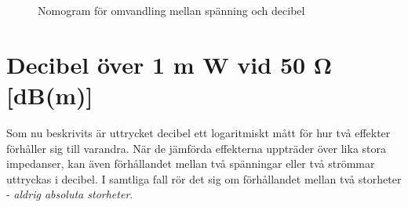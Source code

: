 \begin{rev-raderas}
\begin{figure}
  \caption{Nomogram för omvandling mellan spänning och decibel}
  \label{appendix-c-nomogram-db-spänning}
\end{figure}

\end{rev-raderas}

\section{Decibel över 1 m W vid 50 Ω [dB(m)]}

Som nu beskrivits är uttrycket decibel ett logaritmiskt mått för hur
två effekter förhåller sig till varandra. När de jämförda effekterna
uppträder över lika stora impedanser, kan även förhållandet mellan två
spänningar eller två strömmar uttryckas i decibel. I samtliga fall rör
det sig om förhållandet mellan två storheter - \emph{aldrig absoluta
  storheter}.

